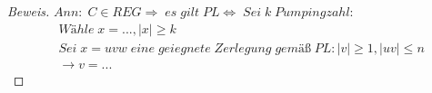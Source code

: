 \begin{proof}[Beweis]
	\begin{math}
		Ann:\;C\in REG\Rightarrow\;es\;gilt\;PL\Leftrightarrow\;Sei\;k\;Pumpingzahl:
	\end{math}
	\begin{align*}
		&Wähle\;x=...,\mid x\mid\ge k\\
		&Sei\;x=uvw\;eine\;geiegnete\;Zerlegung\;gemäß\;PL:\mid v\mid\ge1,\mid uv\mid\le n\\
		&\rightarrow v=...
	\end{align*}
\end{proof}